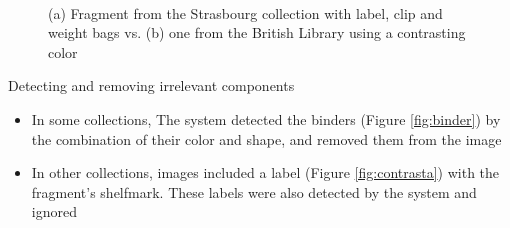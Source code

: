 \documentclass[12pt]{beamer}
\begin{document}
\begin{frame}
\begin{figure}[H]
     \hfill
     \\
     \caption{(a) Fragment from the Strasbourg collection with label, clip and weight bags vs. (b) one from the British Library using a contrasting color}\label{fig:contrast}
\end{figure}
\end{frame}

\begin{frame}{Detecting and removing irrelevant components}
\begin{itemize}
\item In some collections, The system detected the binders (Figure \ref{fig:binder}) by the combination of their color and shape, and removed them from the image
\item In other collections, images included a label (Figure \ref{fig:contrasta})
with the fragment’s shelfmark. These labels were also detected by the
system and ignored
\end{itemize}
\end{frame}
\end{document}

